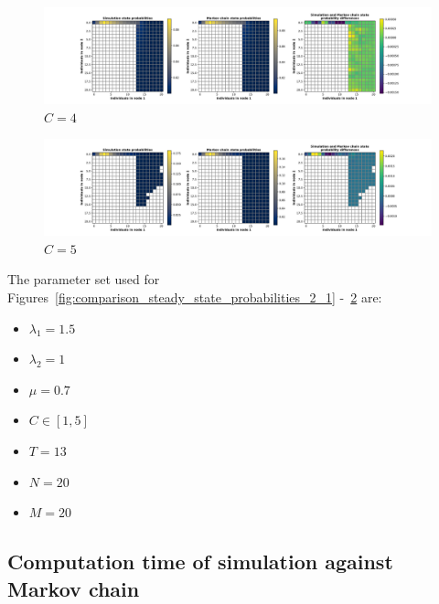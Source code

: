 \begin{figure}[H]
    \includegraphics[width=\textwidth, trim=100 10 100 10, clip]{chapters/03_queueing_model/img/numeric_results_and_timings/steady_state_probabilities_2/main_4.pdf}
    \caption{\(C = 4\)}
    \label{fig:comparison_steady_state_probabilities_2_4}
\end{figure}

\begin{figure}[H]
    \includegraphics[width=\textwidth, trim=100 10 100 10, clip]{chapters/03_queueing_model/img/numeric_results_and_timings/steady_state_probabilities_2/main_5.pdf}
    \caption{\(C = 5\)}
    \label{fig:comparison_steady_state_probabilities_2_5}
\end{figure}


The parameter set used for
Figures~\ref{fig:comparison_steady_state_probabilities_2_1}
-~\ref{fig:comparison_steady_state_probabilities_2_5} are:

\begin{itemize}
    \item \(\lambda_1 = 1.5\)
    \item \(\lambda_2 = 1\)
    \item \(\mu = 0.7\)
    \item \(C \in [1, 5]\)
    \item \(T = 13\)
    \item \(N = 20\)
    \item \(M = 20\)
\end{itemize}


\subsection{Computation time of simulation against Markov chain }


